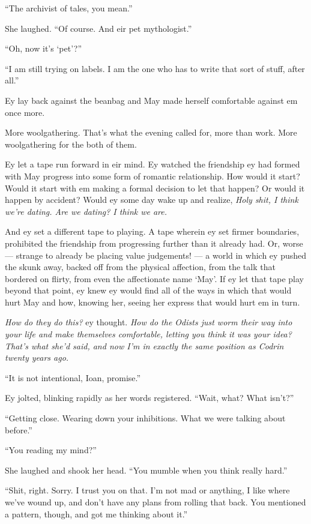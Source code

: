 ``The archivist of tales, you mean.''

She laughed. ``Of course. And eir pet mythologist.''

``Oh, now it's `pet'?''

``I am still trying on labels. I am the one who has to write that sort of stuff, after all.''

Ey lay back against the beanbag and May made herself comfortable against em once more.

More woolgathering. That's what the evening called for, more than work. More woolgathering for the both of them.

Ey let a tape run forward in eir mind. Ey watched the friendship ey had formed with May progress into some form of romantic relationship. How would it start? Would it start with em making a formal decision to let that happen? Or would it happen by accident? Would ey some day wake up and realize, \emph{Holy shit, I think we're dating. Are we dating? I think we are.}

And ey set a different tape to playing. A tape wherein ey set firmer boundaries, prohibited the friendship from progressing further than it already had. Or, worse — strange to already be placing value judgements! — a world in which ey pushed the skunk away, backed off from the physical affection, from the talk that bordered on flirty, from even the affectionate name `May'. If ey let that tape play beyond that point, ey knew ey would find all of the ways in which that would hurt May and how, knowing her, seeing her express that would hurt em in turn.

\emph{How do they do this?} ey thought. \emph{How do the Odists just worm their way into your life and make themselves comfortable, letting you think it was your idea? That's what she'd said, and now I'm in exactly the same position as Codrin twenty years ago.}

``It is not intentional, Ioan, promise.''

Ey jolted, blinking rapidly as her words registered. ``Wait, what? What isn't?''

``Getting close. Wearing down your inhibitions. What we were talking about before.''

``You reading my mind?''

She laughed and shook her head. ``You mumble when you think really hard.''

``Shit, right. Sorry. I trust you on that. I'm not mad or anything, I like where we've wound up, and don't have any plans from rolling that back. You mentioned a pattern, though, and got me thinking about it.''

